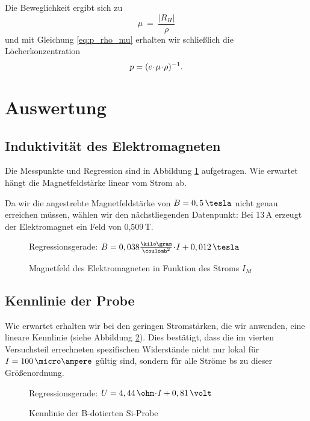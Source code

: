 Die Beweglichkeit ergibt sich zu
\begin{equation}
\mu ~=~ \frac{|R_H|}{\rho}
\end{equation}
und mit Gleichung \eqref{eq:p_rho_mu} erhalten wir schließlich die Löcherkonzentration
\begin{equation}
p = (e \!\cdot\! \mu \!\cdot\! \rho)^{-1}.
\end{equation}


\newpage
\section{Auswertung}

\subsection{Induktivität des Elektromagneten}
Die Messpunkte und Regression sind in Abbildung \ref{fig:plot_B} aufgetragen. Wie erwartet hängt die Magnetfeldstärke linear vom Strom ab.

Da wir die angestrebte Magnetfeldstärke von $B = 0,5 \,\tesla$ nicht genau erreichen müssen, wählen wir den nächstliegenden Datenpunkt: Bei 13\,A erzeugt der Elektromagnet ein Feld von 0,509\,T.

\begin{figure}[p]
\centering

\caption{Magnetfeld des Elektromagneten in Funktion des Stroms $I_M$}
\label{fig:plot_B}
\vspace{-0.5ex}
Regressionsgerade: $B = 0,038 \frac{\kilo\gram}{\coulomb^2}  \cdt  I  +  0,012\,\tesla$
\end{figure}

\subsection{Kennlinie der Probe}
Wie erwartet erhalten wir bei den geringen Stromstärken, die wir anwenden, eine lineare Kennlinie (siehe Abbildung \ref{fig:plot_Kenn}). Dies bestätigt, dass die im vierten Versuchsteil errechneten spezifischen Widerstände nicht nur lokal für $I = 100\,\micro\ampere$ gültig sind, sondern für alle Ströme bs zu dieser Größenordnung.

\begin{figure}[p]
\centering

\caption{Kennlinie der \textsf{B}-dotierten \textsf{Si}-Probe}
\label{fig:plot_Kenn}
\vspace{-0.5ex}
Regressionsgerade: $U = 4,44\,\ohm \cdt  I  +  0,81\,\volt$
\end{figure}

